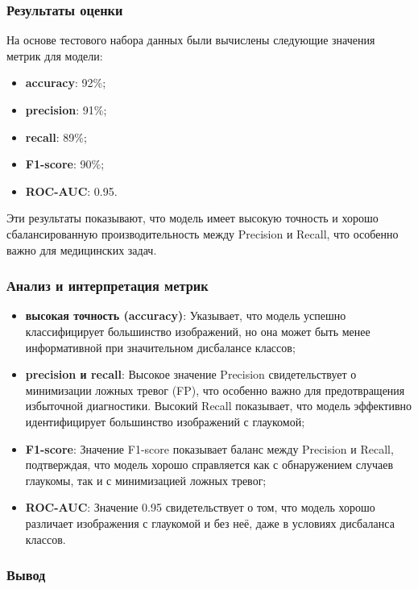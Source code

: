 {    \subsubsection*{Результаты оценки}

    На основе тестового набора данных были вычислены следующие значения метрик для модели:

    \begin{itemize}
        \item \textbf{accuracy}: 92\%;
        \item \textbf{precision}: 91\%;
        \item \textbf{recall}: 89\%;
        \item \textbf{F1-score}: 90\%;
        \item \textbf{ROC-AUC}: 0.95.
    \end{itemize}

    Эти результаты показывают, что модель имеет высокую точность и хорошо сбалансированную производительность между Precision и Recall, что особенно важно для медицинских задач.

    \subsubsection*{Анализ и интерпретация метрик}

    \begin{itemize}
        \item \textbf{высокая точность (accuracy)}: Указывает, что модель успешно классифицирует большинство изображений, но она может быть менее информативной при значительном дисбалансе классов;
        \item \textbf{precision и recall}: Высокое значение Precision свидетельствует о минимизации ложных тревог (FP), что особенно важно для предотвращения избыточной диагностики. Высокий Recall показывает, что модель эффективно идентифицирует большинство изображений с глаукомой;
        \item \textbf{F1-score}: Значение F1-score показывает баланс между Precision и Recall, подтверждая, что модель хорошо справляется как с обнаружением случаев глаукомы, так и с минимизацией ложных тревог;
        \item \textbf{ROC-AUC}: Значение 0.95 свидетельствует о том, что модель хорошо различает изображения с глаукомой и без неё, даже в условиях дисбаланса классов.
    \end{itemize}

    \subsubsection*{Вывод}

}
